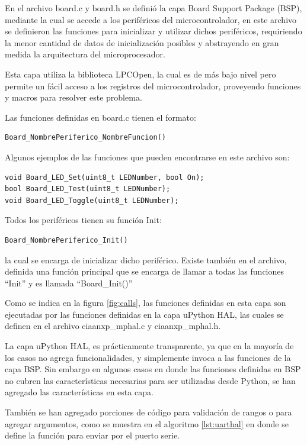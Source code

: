 En el archivo board.c y board.h se definió la capa Board Support Package (BSP), mediante la cual se accede a los periféricos del microcontrolador, en este archivo se definieron las funciones para inicializar y utilizar dichos periféricos, requiriendo la menor cantidad de datos de inicialización posibles y abstrayendo en gran medida la arquitectura del microprocesador.

Esta capa utiliza la biblioteca LPCOpen, la cual es de más bajo nivel pero permite un fácil acceso a los registros del microcontrolador, proveyendo funciones y macros para resolver este problema.

Las funciones definidas en board.c tienen el formato:

\begin{verbatim}
Board_NombrePeriferico_NombreFuncion()
\end{verbatim}

Algunos ejemplos de las funciones que pueden encontrarse en este archivo son:

\begin{verbatim}
void Board_LED_Set(uint8_t LEDNumber, bool On);
bool Board_LED_Test(uint8_t LEDNumber);
void Board_LED_Toggle(uint8_t LEDNumber);
\end{verbatim}

Todos los periféricos tienen su función Init:
\begin{verbatim}
Board_NombrePeriferico_Init()
\end{verbatim}

la cual se encarga de inicializar dicho periférico. Existe también en el archivo, definida una función principal que se encarga de llamar a todas las funciones “Init” y es llamada “Board\_Init()”

Como se indica en la figura \ref{fig:calls}, las funciones definidas en esta capa son ejecutadas por las funciones definidas en la capa uPython HAL, las cuales se definen en el archivo ciaanxp\_mphal.c y ciaanxp\_mphal.h.

La capa uPython HAL, es prácticamente transparente, ya que en la mayoría de los casos no agrega funcionalidades, y simplemente invoca a las funciones de la capa BSP. 
Sin embargo en algunos casos en donde las funciones definidas en BSP no cubren las características necesarias para ser utilizadas desde Python, se han agregado las características en esta capa.

También se han agregado porciones de código para validación de rangos o para agregar argumentos, como se muestra en el algoritmo \ref{lst:uarthal} en donde se define la función para enviar por el puerto serie.

